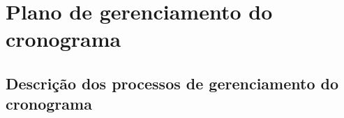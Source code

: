 
\chapter{Plano de gerenciamento do cronograma}

\section{Descrição dos processos de gerenciamento do cronograma}

